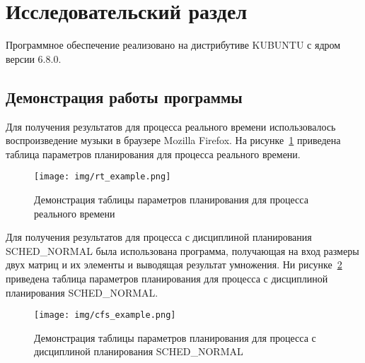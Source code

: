 \section{Исследовательский раздел}

Программное обеспечение реализовано на дистрибутиве KUBUNTU с ядром версии 6.8.0.

\subsection{Демонстрация работы программы}

Для получения результатов для процесса реального времени использовалось воспроизведение музыки в браузере Mozilla Firefox.
На рисунке~\ref{fig:rt_example} приведена таблица параметров планирования для процесса реального времени.

\begin{figure}[H]
	\centering
	\texttt{[image: img/rt\_example.png]}
	\caption{Демонстрация таблицы параметров планирования для процесса реального времени}
	\label{fig:rt_example}
\end{figure}

Для получения результатов для процесса с дисциплиной планирования SCHED\_NORMAL была использована программа, получающая на вход размеры двух матриц и их элементы и выводящая результат умножения.
Ни рисунке~\ref{fig:cfs_example} приведена таблица параметров планирования для процесса с дисциплиной планирования SCHED\_NORMAL.

\begin{figure}[H]
	\centering
	\texttt{[image: img/cfs\_example.png]}
	\caption{Демонстрация таблицы параметров планирования для процесса с дисциплиной планирования SCHED\_NORMAL}
	\label{fig:cfs_example}
\end{figure}

